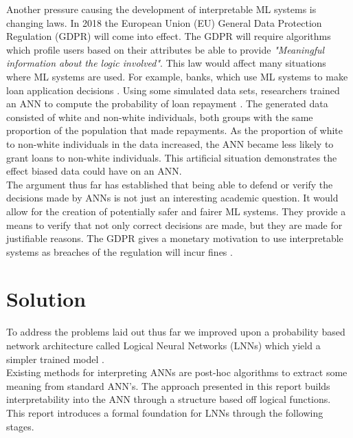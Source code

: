 Another pressure causing the development of interpretable ML systems is changing laws. In 2018 the European Union (EU) General Data Protection Regulation \cite{eu-dgpr} (GDPR) will come into effect. The GDPR will require algorithms which profile users based on their attributes be able to provide \textit{"Meaningful information about the logic involved"}. This law would affect many situations where ML systems are used. For example, banks, which use ML systems to make loan application decisions \cite{goodman2016european}. Using some simulated data sets, researchers trained an ANN to compute the probability of loan repayment \cite{goodman2016european}. The generated data consisted of white and non-white individuals, both groups with the same proportion of the population that made repayments. As the proportion of white to non-white individuals in the data increased, the ANN became less likely to grant loans to non-white individuals. This artificial situation demonstrates the effect biased data could have on an ANN.\\

The argument thus far has established that being able to defend or verify the decisions made by ANNs is not just an interesting academic question. It would allow for the creation of potentially safer and fairer ML systems. They provide a means to verify that not only correct decisions are made, but they are made for justifiable reasons. The GDPR gives a monetary motivation to use interpretable systems as breaches of the regulation will incur fines \cite{goodman2016european}.\\

\section{Solution}
To address the problems laid out thus far we improved upon a probability based network architecture called Logical Neural Networks (LNNs) which yield a simpler trained model \cite{LearningLogicalActivations}.\\

Existing methods for interpreting ANNs are post-hoc algorithms to extract some meaning from standard ANN's. The approach presented in this report builds interpretability into the ANN through a structure based off logical functions. This report introduces a formal foundation for LNNs through the following stages.

